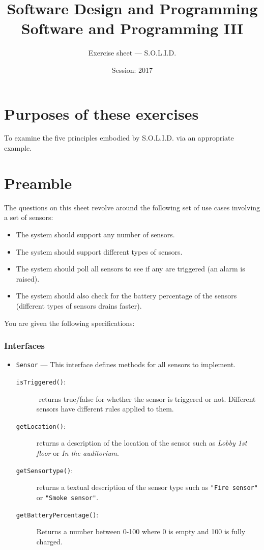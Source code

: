 \documentclass[12pt,a4paper,times]{exam}
\title{Software Design and Programming\\ Software and Programming III}
\author{Exercise sheet --- S.O.L.I.D.}
\date{Session: 2017}
\begin{document}
\maketitle

\section*{Purposes of these exercises}\label{purposes-of-this-assignment}

To examine the five principles embodied by S.O.L.I.D. via an appropriate example.

\section*{Preamble}

The questions on this sheet revolve around the following set of use cases 
involving a set of sensors:
\begin{itemize}
\item The system should support any number of sensors.
\item The system should support different types of sensors.
\item The system should poll all sensors to see if any are triggered (an alarm is raised).
\item The system should also check for the battery percentage of the sensors 
(different types of sensors drains faster).
\end{itemize}
You are given the following specifications:

\subsubsection*{Interfaces}
\begin{itemize}
	\item \verb!Sensor! --- This interface defines methods for all sensors to implement.
	\begin{description}
		\item[\texttt{isTriggered()}:]  returns true/false for whether the sensor is triggered or not.
			Different sensors have different rules applied to them.
		\item[\texttt{getLocation()}:] returns a description of the location of the 
		sensor such as \emph{Lobby 1st floor} or \emph{In the auditorium}.
		\item[\texttt{getSensortype()}:] returns a textual description of the sensor type such as 
			\verb!"Fire sensor"! or \verb!"Smoke sensor"!.
		\item[\texttt{getBatteryPercentage()}:] Returns a number between 0-100 where 0 is empty 
			and 100 is fully charged.
	\end{description}
\end{itemize}
\end{document}
